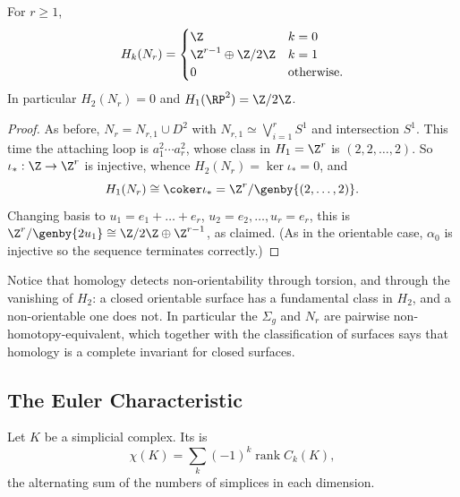 \begin{center}
\end{center}

\begin{theorem} \label{thm:nonorientable-homology}
	For $r \geq 1$,
	$$
	H_k(N_r) = \begin{cases}\Z & k = 0\\ \Z^{r-1}\oplus \Z/2\Z & k = 1\\ 0 & \text{otherwise.}\end{cases}
	$$
	In particular $H_2(N_r) = 0$ and $H_1(\RP^2) = \Z/2\Z$.
\end{theorem}
\begin{proof}
	As before, $N_r = N_{r,1}\cup D^2$ with $N_{r,1}\simeq\bigvee_{i=1}^rS^1$ and intersection $S^1$. This time the attaching loop is $a_1^2\cdots a_r^2$, whose class in $H_1 = \Z^r$ is $(2,2,\dots,2)$. So $\iota_*: \Z\to\Z^r$ is injective, whence $H_2(N_r) = \ker\iota_* = 0$, and
	$$
	H_1(N_r) \cong \coker\iota_* = \Z^r/\genby{(2,\dots,2)}.
	$$
	Changing basis to $u_1 = e_1+\dots+e_r$, $u_2 = e_2,\dots,u_r = e_r$, this is $\Z^r/\genby{2u_1}\cong \Z/2\Z\oplus\Z^{r-1}$, as claimed. (As in the orientable case, $\alpha_0$ is injective so the sequence terminates correctly.)
\end{proof}

Notice that homology detects non-orientability through torsion, and through the vanishing
of $H_2$: a closed orientable surface has a fundamental class in $H_2$, and a
non-orientable one does not. In particular the $\Sigma_g$ and $N_r$ are pairwise
non-homotopy-equivalent, which together with the classification of surfaces says that
homology is a complete invariant for closed surfaces.

\subsection{The Euler Characteristic}

\begin{definition}
	Let $K$ be a simplicial complex. Its  is
	$$
	\chi(K) = \sum_k(-1)^k \operatorname{rank}C_k(K),
	$$
	the alternating sum of the numbers of simplices in each dimension.
\end{definition}

